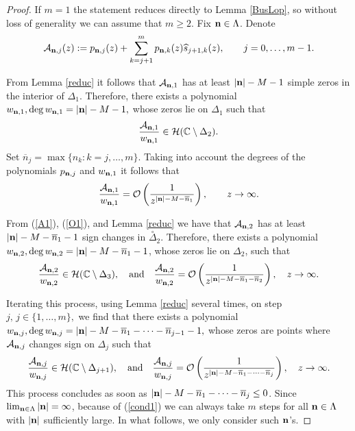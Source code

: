 \documentclass[10pt,a4paper]{article}
\theoremstyle{definition}
\theoremstyle{remark}
\numberwithin{equation}{section}
\begin{document}
\begin{proof}
If $m=1$ the statement reduces directly to Lemma \ref{BusLop}, so without loss of generality we can assume that $m \geq 2$. Fix ${\bf n} \in \Lambda$.
 Denote
 $$ \mathcal{A}_{{\bf n},j}(z) := p_{{\bf n},j}(z) + \sum_{k= j+1}^m p_{{\bf n},k}(z) \widehat{s}_{j+1,k}(z), \qquad j=0,\ldots,m-1.$$

From  Lemma \ref{reduc} it follows that
 $\mathcal{A}_{{\bf n},1}$ has at least  $|{\bf n}| -M-1$ simple zeros in the interior of  $\Delta_1$. Therefore, there exists a polynomial
$w_{{\bf n},1}, \deg w_{{\bf n},1} = |{\bf n}| -M-1,$ whose zeros lie on $\Delta_1$ such that
\begin{equation} \label{A1}
\frac{\mathcal{A}_{{\bf n},1}}{w_{{\bf n},1}}  \in \mathcal{H}(\mathbb{C} \setminus \Delta_2).
\end{equation}
Set $\overline{n}_j = \max \{n_k: k=j,\ldots,m\}$. Taking into account the degrees of the polynomials $p_{{\bf n},j}$ and $w_{{\bf n},1}$ it follows that
\begin{equation} \label{O1}
 \frac{\mathcal{A}_{{\bf n},1}}{w_{{\bf n},1}} = \mathcal{O}\left(\frac{1}{z^{|{\bf n}| -M- \overline{n}_1}}\right), \qquad z\to \infty.
\end{equation}

From  (\ref{A1}), (\ref{O1}), and Lemma \ref{reduc} we have
that $\mathcal{A}_{{\bf n},2}$ has at least $|{\bf n}| - M-\overline{n}_1 -1$ sign changes in  $\stackrel{\circ}{\Delta}_2$.  Therefore, there exists a polynomial  $w_{{\bf n},2}, \deg w_{{\bf n},2} = |{\bf n}| - M-\overline{n}_1 -1$, whose zeros lie on $\Delta_2$, such that
\[ \frac{\mathcal{A}_{{\bf n},2}}{w_{{\bf n},2}}  \in \mathcal{H}(\mathbb{C} \setminus \Delta_3), \quad \mbox{and} \quad \frac{\mathcal{A}_{{\bf n},2}}{w_{{\bf n},2}} = \mathcal{O}\left(\frac{1}{z^{|{\bf n}| -M- \overline{n}_1 - \overline{n}_2}}\right) , \quad z \to \infty.
\]

Iterating this process, using Lemma \ref{reduc} several times, on step $j,\, j \in \{1,\ldots,m\},$ we find that there exists a polynomial
$w_{{\bf n},j}, \deg w_{{\bf n},j} = |{\bf n}| -M-\overline{n}_1 -\cdots - \overline{n}_{j-1}- 1,$ whose zeros are points where $\mathcal{A}_{{\bf n},j}$ changes sign on $\Delta_j$ such that
\begin{equation} \label{Anj}
\frac{\mathcal{A}_{{\bf n},j}}{w_{{\bf n},j}}  \in \mathcal{H}(\mathbb{C} \setminus \Delta_{j+1}), \quad \mbox{and} \quad \frac{\mathcal{A}_{{\bf n},j}}{w_{{\bf n},j}} = \mathcal{O}\left(\frac{1}{z^{|{\bf n}| -M- \overline{n}_1 - \cdots-\overline{n}_j}}\right) , \quad z \to \infty.
\end{equation}
This process concludes as soon as $|{\bf n}| - M-\overline{n}_1 - \cdots-\overline{n}_j \leq 0$. Since $\lim_{{\bf n} \in \Lambda} |{\bf n}| = \infty$, because of (\ref{cond1}) we can always take $m$ steps for all ${\bf n} \in \Lambda$ with $|{\bf n}|$ sufficiently large. In what follows, we only consider such ${\bf n}$'s.


\end{proof}
\end{document}
